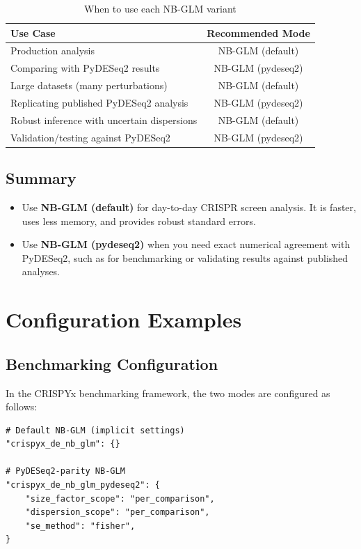 \documentclass{article}
\begin{document}
\begin{table}[h]
\centering
\caption{When to use each NB-GLM variant}
\label{tab:recommendations}
\begin{tabular}{lc}
\toprule
\textbf{Use Case} & \textbf{Recommended Mode} \\
\midrule
Production analysis & NB-GLM (default) \\
Comparing with PyDESeq2 results & NB-GLM (pydeseq2) \\
Large datasets (many perturbations) & NB-GLM (default) \\
Replicating published PyDESeq2 analysis & NB-GLM (pydeseq2) \\
Robust inference with uncertain dispersions & NB-GLM (default) \\
Validation/testing against PyDESeq2 & NB-GLM (pydeseq2) \\
\bottomrule
\end{tabular}
\end{table}

\subsection{Summary}

\begin{itemize}
    \item Use \textbf{NB-GLM (default)} for day-to-day CRISPR screen analysis. It is faster, uses less memory, and provides robust standard errors.
    
    \item Use \textbf{NB-GLM (pydeseq2)} when you need exact numerical agreement with PyDESeq2, such as for benchmarking or validating results against published analyses.
\end{itemize}

\section{Configuration Examples}

\subsection{Benchmarking Configuration}

In the CRISPYx benchmarking framework, the two modes are configured as follows:

\begin{lstlisting}[caption={Benchmarking configuration for NB-GLM variants}]
# Default NB-GLM (implicit settings)
"crispyx_de_nb_glm": {}

# PyDESeq2-parity NB-GLM
"crispyx_de_nb_glm_pydeseq2": {
    "size_factor_scope": "per_comparison",
    "dispersion_scope": "per_comparison",
    "se_method": "fisher",
}
\end{lstlisting}
\end{document}
